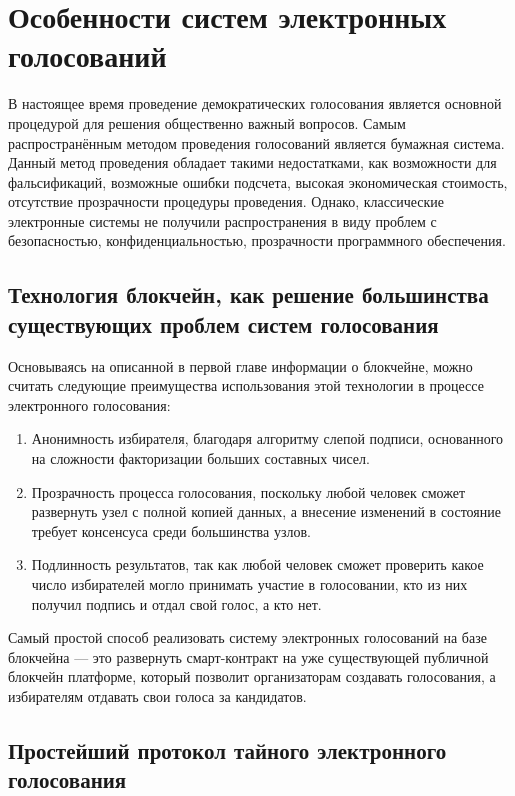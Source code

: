 \chapter{Особенности систем электронных голосований}

В настоящее время проведение демократических голосования является основной процедурой для решения общественно важный вопросов. Самым распространённым методом проведения голосований является бумажная система. Данный метод проведения обладает такими недостатками, как возможности для фальсификаций, возможные ошибки подсчета, высокая экономическая стоимость, отсутствие прозрачности процедуры проведения. Однако, классические электронные системы не получили распространения в виду проблем с безопасностью, конфиденциальностью, прозрачности программного обеспечения.

\section{Технология блокчейн, как решение большинства существующих проблем систем голосования}

Основываясь на описанной в первой главе информации о блокчейне, можно считать следующие преимущества использования этой технологии в процессе электронного голосования:

\begin{enumerate} 
  \item Анонимность избирателя, благодаря алгоритму слепой подписи, основанного на сложности факторизации больших составных чисел.
  
  \item Прозрачность процесса голосования, поскольку любой человек сможет развернуть узел с полной копией данных, а внесение изменений в состояние требует консенсуса среди большинства узлов.
  
  \item Подлинность результатов, так как любой человек сможет проверить какое число избирателей могло принимать участие в голосовании, кто из них получил подпись и отдал свой голос, а кто нет.
\end{enumerate}

Самый простой способ реализовать систему электронных голосований на базе блокчейна — это развернуть смарт-контракт на уже существующей публичной блокчейн платформе, который позволит организаторам создавать голосования, а избирателям отдавать свои голоса за кандидатов.

\section{Простейший протокол тайного электронного голосования}

